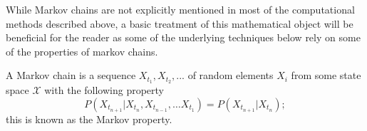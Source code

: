 While Markov chains are not explicitly mentioned in most of the computational methods described above, a basic treatment of this mathematical object will be beneficial for the reader as some of the underlying techniques below rely on some of the properties of markov chains.

A Markov chain is a sequence $X_{t_1}, X_{t_2}, ...$ of random elements $X_i$ from some state space $\mathscr{X}$ with the following property
    \begin{equation}
        P(X_{t_{n+1}}|X_{t_n},X_{t_{n-1}},\ldots X_{t_1}) = P(X_{t_{n+1}}|X_{t_n});
    \end{equation}
this is known as the Markov property.
        
